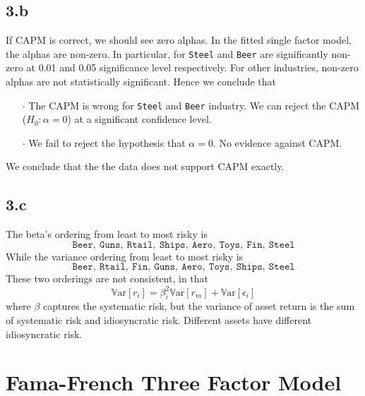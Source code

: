 \documentclass[10 pt]{hwtemplate} %
\begin{document}
\subsection*{3.b} If CAPM is correct, we should see zero alphas. In the fitted single factor model, the alphas are non-zero. In particular, for \texttt{Steel} and \texttt{Beer} are significantly non-zero at 0.01 and 0.05 significance level respectively. For other industries, non-zero alphas are not statistically significant. Hence we conclude that
\begin{itemize}
  \item[$\cdot$] The CAPM is wrong for \texttt{Steel} and \texttt{Beer} industry. We can reject the CAPM ($H_0: \alpha = 0$) at a significant confidence level.
  \item[$\cdot$] We fail to reject the hypothesis that $\alpha = 0$. No evidence against CAPM.
\end{itemize}
We conclude that the the data does not support CAPM exactly.

\subsection*{3.c} The beta's ordering from least to most risky is
$$
\texttt{Beer},~\texttt{Guns},~\texttt{Rtail},~\texttt{Ships},~\texttt{Aero},~\texttt{Toys},~\texttt{Fin},~\texttt{Steel}
$$
While the variance ordering from least to most risky is
$$
\texttt{Beer},~\texttt{Rtail},~\texttt{Fin},~\texttt{Guns},~\texttt{Aero},~\texttt{Toys},~\texttt{Ships},~\texttt{Steel}
$$
These two orderings are not consistent, in that
\begin{equation}
  \mathrm{\mathbb{V}ar}\left[r_i\right] = \beta_i^2 \mathrm{\mathbb{V}ar}\left[r_m\right] + \mathrm{\mathbb{V}ar}\left[\epsilon_i\right]
\end{equation}
where $\beta$ captures the systematic risk, but the variance of asset return is the sum of systematic risk and idiosyncratic risk. Different assets have different idiosyncratic risk.


\section{Fama-French Three Factor Model}
\end{document}
